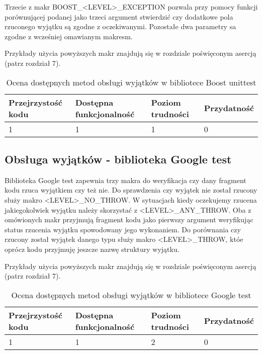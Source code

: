 \documentclass[12pt,a4paper,notitlepage]{report}
\begin{document}
Trzecie z makr BOOST{\_}<LEVEL>{\_}EXCEPTION pozwala przy pomocy funkcji porównującej podanej jako trzeci argument stwierdzić czy dodatkowe pola rzuconego wyjątku są zgodne z oczekiwanymi. Pozostałe dwa parametry sa zgodne z wcześniej omawianym makresm.

Przykłady użycia powyższych makr znajdują się w rozdziale poświęconym asercją (patrz rozdział 7).

\begin{center}
			\begin{table}[!ht]
			\caption{Ocena dostępnych metod obsługi wyjątków w bibliotece Boost unittest}
			\label{}
			\begin{tabular}[!hc]{|l|l|l|l|}
		\hline
		Przejrzystość kodu 	&	Dostępna funkcjonalność	&	Poziom trudności	&	Przydatność \\ \hline
		1					&	1						&	1					& 	0  			\\ \hline
			\end{tabular}
			\end{table} 
		\end{center}

\subsection{Obsługa wyjątków - biblioteka Google test}
Biblioteka Google test zapewnia trzy makra do weryfikacja czy dany fragment kodu rzuca wyjątkiem czy też nie.
Do sprawdzenia czy wyjątek nie został rzucony służy makro <LEVEL>{\_}NO{\_}THROW.
W sytuacjach kiedy oczekujemy rzucena jakiegokolwiek wyjątku należy skorzystać z <LEVEL>{\_}ANY{\_}THROW. Oba z omówionych makr przyjmują fragment kodu jako pierwszy argument weryfikując status rzucenia wyjątku spowodowany jego wykonaniem.
Do porównania czy rzucony został wyjątek danego typu służy makro <LEVEL>{\_}THROW, któe oprócz kodu przyjmuję jeszcze nazwę struktury wyjątku.

Przykłady użycia powyższych makr znajdują się w rozdziale poświęconym asercją (patrz rozdział 7). 

\begin{center}
			\begin{table}[!ht]
			\caption{Ocena dostępnych metod obsługi wyjątków w bibliotece Google test}
			\label{}
			\begin{tabular}[!hc]{|l|l|l|l|}
		\hline
		Przejrzystość kodu 	&	Dostępna funkcjonalność	&	Poziom trudności	&	Przydatność \\ \hline
		1					&	1						&	2					& 	0  			\\ \hline
			\end{tabular}
			\end{table} 
		\end{center}
\end{document}
